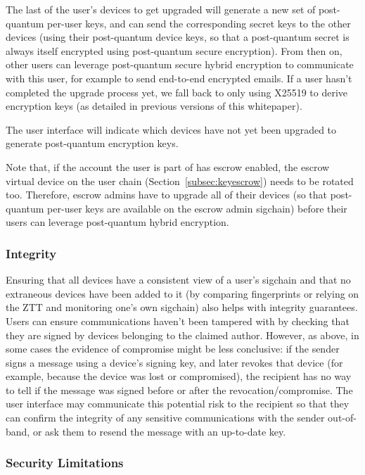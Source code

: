The last of the user's devices to get upgraded will generate a new set of post-quantum per-user
keys, and can send the corresponding secret keys to the other devices (using their post-quantum
device keys, so that a post-quantum secret is always itself encrypted using post-quantum secure
encryption). From then on, other users can leverage post-quantum secure hybrid encryption to
communicate with this user, for example to send end-to-end encrypted emails. If a user hasn't
completed the upgrade process yet, we fall back to only using X25519 to derive encryption keys (as
detailed in previous versions of this whitepaper).

The user interface will indicate which devices have not yet been upgraded to generate post-quantum
encryption keys.

Note that, if the account the user is part of has escrow enabled, the escrow virtual device on the
user chain (Section~\ref{subsec:keyescrow}) needs to be rotated too. Therefore, escrow admins have
to upgrade all of their devices (so that post-quantum per-user keys are available on the escrow
admin sigchain) before their users can leverage post-quantum hybrid encryption. 

\subsubsection{Integrity}
Ensuring that all devices have a consistent view of a user's sigchain and that no extraneous devices
have been added to it (by comparing fingerprints or relying on the ZTT and monitoring one's own
sigchain) also helps with integrity guarantees. Users can ensure communications haven't been
tampered with by checking that they are signed by devices belonging to the claimed author. However,
as above, in some cases the evidence of compromise might be less conclusive: if the sender signs a
message using a device's signing key, and later revokes that device (for example, because the device
was lost or compromised), the recipient has no way to tell if the message was signed before or after
the revocation/compromise. The user interface may communicate this potential risk to the recipient
so that they can confirm the integrity of any sensitive communications with the sender out-of-band,
or ask them to resend the message with an up-to-date key.

\subsubsection{Security Limitations}

